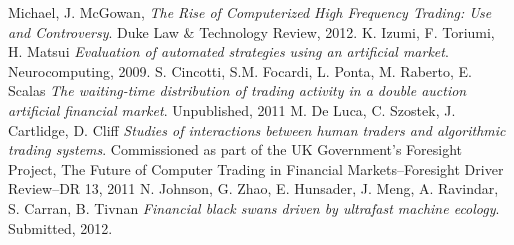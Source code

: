 \documentclass[14pt]{beamer}
\begin{document}



















\begin{thebibliography}{Bib}

  Michael, J. McGowan,
  \emph{The Rise of Computerized High Frequency Trading: Use and Controversy}.
  Duke Law \& Technology Review,
  2012.
  K. Izumi, F. Toriumi, H. Matsui
  \emph{Evaluation of automated strategies using an artificial market}.
  Neurocomputing,
  2009.
  S. Cincotti, S.M. Focardi, L. Ponta, M. Raberto, E. Scalas
  \emph{The waiting-time distribution of trading activity in a double auction artificial financial market}. Unpublished, 2011
  M. De Luca, C. Szostek, J. Cartlidge, D. Cliff
  \emph{Studies of interactions between human traders and algorithmic trading systems}.
  Commissioned as part of the UK {Government's} Foresight Project, The Future of Computer Trading in Financial Markets--Foresight Driver Review--DR 13, 2011
  N. Johnson, G. Zhao, E. Hunsader, J. Meng, A. Ravindar, S. Carran, B. Tivnan
  \emph{Financial black swans driven by ultrafast machine ecology}.
  Submitted, 2012.
   

\end{thebibliography}
\end{document}
